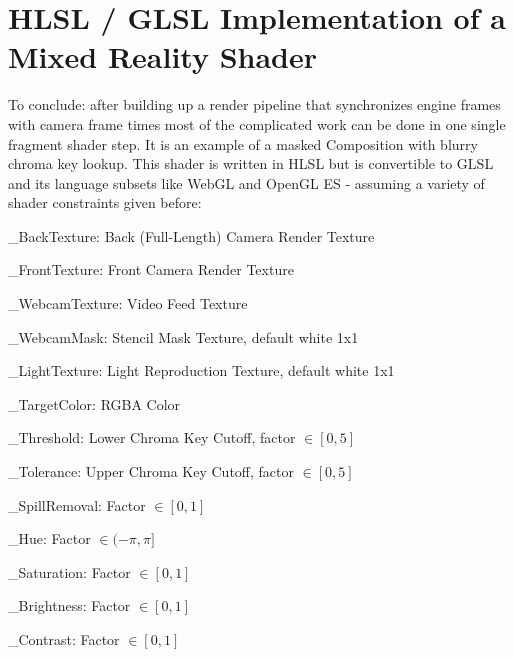 %
\chapter{HLSL / GLSL Implementation of a Mixed Reality Shader}


To conclude: after building up a render pipeline that synchronizes engine 
frames with camera frame times most of the complicated work can be done in one 
single fragment shader step. It is an example of a masked Composition with 
blurry chroma key lookup. This shader is written in HLSL but is convertible 
to GLSL and its language subsets like WebGL and OpenGL ES - assuming a variety 
of shader constraints given before:


\begin{my_list}
	\item \_BackTexture: Back (Full-Length) Camera Render Texture
	\item \_FrontTexture: Front Camera Render Texture
	\item \_WebcamTexture: Video Feed Texture
	\item \_WebcamMask: Stencil Mask Texture, default white 1x1
	\item \_LightTexture: Light Reproduction Texture, default white 1x1
	\item \_TargetColor: RGBA Color
	\item \_Threshold: Lower Chroma Key Cutoff, factor $\in [0, 5]$
	\item \_Tolerance: Upper Chroma Key Cutoff, factor $\in [0, 5]$
	\item \_SpillRemoval: Factor $\in [0, 1]$
	\item \_Hue: Factor $\in (-\pi, \pi]$
	\item \_Saturation: Factor $\in [0, 1]$
	\item \_Brightness: Factor $\in [0, 1]$
	\item \_Contrast: Factor $\in [0, 1]$
\end{my_list}

